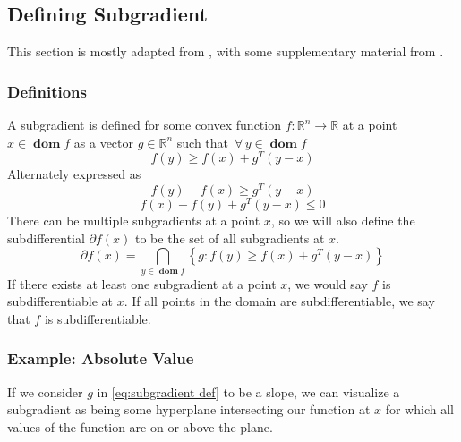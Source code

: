 \documentclass[journal,onecolumn]{IEEEtran}
\DeclareMathOperator{\dom}{\mathbf{dom}}
\let\oldforall\forall
\renewcommand{\forall}{ \, \oldforall \, }
\begin{document}
\subsection{Defining Subgradient}\label{sec:math subgrad}
This section is mostly adapted from \cite{boydvandenberghesubgradient}, with some supplementary material from \cite{boydparksubgradients}.
\subsubsection{Definitions}
A subgradient is defined for some convex function \(f: \mathbb{R}^n \rightarrow \mathbb{R}\) at a point \(x \in \dom f\) as a vector \(g \in \mathbb{R}^n\) such that \(\forall y \in \dom f\)
\begin{equation}\label{eq:subgradient def}
f(y) \geq f(x) + g^T (y-x) 
\end{equation}
Alternately expressed as
\begin{equation}\label{eq:modified subradient def 2}
    f(y) - f(x) \geq g^T(y-x)
\end{equation}
\begin{equation}\label{eq:modified subgradient def}
    f(x) - f(y) + g^T(y-x) \leq 0
\end{equation}
There can be multiple subgradients at a point \(x\), so we will also define the subdifferential \(\partial f(x)\) to be the set of all subgradients at \(x\).
\begin{equation}\label{eq:math subdifferential}
\partial f(x) = \bigcap_{y \in \dom f} \left\{ g : f(y) \geq f(x) + g^T (y-x)\right\}
\end{equation}
If there exists at least one subgradient at a point \(x\), we would say \(f\) is subdifferentiable at \(x\). If all points in the domain are subdifferentiable, we say that \(f\) is subdifferentiable.

\subsubsection{Example: Absolute Value}
If we consider \(g\) in \eqref{eq:subgradient def} to be a slope, we can visualize a subgradient as being some hyperplane intersecting our function at \(x\) for which all values of the function are on or above the plane. 
\end{document}

